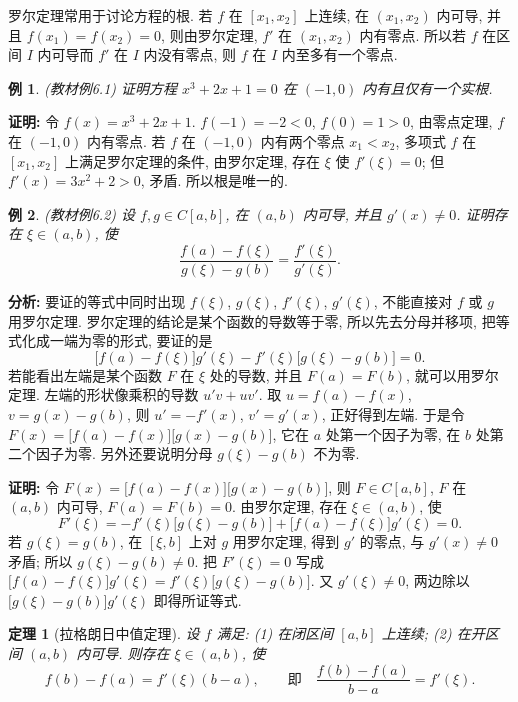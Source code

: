 \documentclass[UTF8,openany]{ctexbook}
\theoremstyle{chinesetextbook}
\newtheorem{example}{例}[section]
\newtheorem{theorem}{定理}[section]
\newenvironment{cnproof}{\par\indent\textbf{证明:} \ignorespaces}{\par}
\begin{document}
罗尔定理常用于讨论方程的根. 若 $f$ 在 $[x_1,x_2]$ 上连续, 在 $(x_1,x_2)$ 内可导, 并且 $f(x_1)=f(x_2)=0$, 则由罗尔定理, $f'$ 在 $(x_1,x_2)$ 内有零点. 所以若 $f$ 在区间 $I$ 内可导而 $f'$ 在 $I$ 内没有零点, 则 $f$ 在 $I$ 内至多有一个零点.
\begin{example}\label{ex:c2-6-1}
\textnormal{(教材例6.1)} 证明方程 $x^3+2x+1=0$ 在 $(-1,0)$ 内有且仅有一个实根.
\end{example}
\begin{cnproof}
令 $f(x)=x^3+2x+1$. $f(-1)=-2<0$, $f(0)=1>0$, 由零点定理, $f$ 在 $(-1,0)$ 内有零点. 若 $f$ 在 $(-1,0)$ 内有两个零点 $x_1<x_2$, 多项式 $f$ 在 $[x_1,x_2]$ 上满足罗尔定理的条件, 由罗尔定理, 存在 $\xi$ 使 $f'(\xi)=0$; 但 $f'(x)=3x^2+2>0$, 矛盾. 所以根是唯一的.
\end{cnproof}
\begin{example}\label{ex:c2-6-2}
\textnormal{(教材例6.2)} 设 $f,g\in C[a,b]$, 在 $(a,b)$ 内可导, 并且 $g'(x)\ne0$. 证明存在 $\xi\in(a,b)$, 使
\[
\frac{f(a)-f(\xi)}{g(\xi)-g(b)}=\frac{f'(\xi)}{g'(\xi)}.
\]
\end{example}
\par\indent\textbf{分析:} 要证的等式中同时出现 $f(\xi)$, $g(\xi)$, $f'(\xi)$, $g'(\xi)$, 不能直接对 $f$ 或 $g$ 用罗尔定理. 罗尔定理的结论是某个函数的导数等于零, 所以先去分母并移项, 把等式化成一端为零的形式, 要证的是
\[
\bigl[f(a)-f(\xi)\bigr]g'(\xi)-f'(\xi)\bigl[g(\xi)-g(b)\bigr]=0.
\]
若能看出左端是某个函数 $F$ 在 $\xi$ 处的导数, 并且 $F(a)=F(b)$, 就可以用罗尔定理. 左端的形状像乘积的导数 $u'v+uv'$. 取 $u=f(a)-f(x)$, $v=g(x)-g(b)$, 则 $u'=-f'(x)$, $v'=g'(x)$, 正好得到左端. 于是令 $F(x)=\bigl[f(a)-f(x)\bigr]\bigl[g(x)-g(b)\bigr]$, 它在 $a$ 处第一个因子为零, 在 $b$ 处第二个因子为零. 另外还要说明分母 $g(\xi)-g(b)$ 不为零.
\begin{cnproof}
令 $F(x)=\bigl[f(a)-f(x)\bigr]\bigl[g(x)-g(b)\bigr]$, 则 $F\in C[a,b]$, $F$ 在 $(a,b)$ 内可导, $F(a)=F(b)=0$. 由罗尔定理, 存在 $\xi\in(a,b)$, 使
\[
F'(\xi)=-f'(\xi)\bigl[g(\xi)-g(b)\bigr]+\bigl[f(a)-f(\xi)\bigr]g'(\xi)=0.
\]
若 $g(\xi)=g(b)$, 在 $[\xi,b]$ 上对 $g$ 用罗尔定理, 得到 $g'$ 的零点, 与 $g'(x)\ne0$ 矛盾; 所以 $g(\xi)-g(b)\ne0$. 把 $F'(\xi)=0$ 写成 $\bigl[f(a)-f(\xi)\bigr]g'(\xi)=f'(\xi)\bigl[g(\xi)-g(b)\bigr]$. 又 $g'(\xi)\ne0$, 两边除以 $\bigl[g(\xi)-g(b)\bigr]g'(\xi)$ 即得所证等式.
\end{cnproof}
\begin{theorem}[拉格朗日中值定理]\label{thm:c2-6-lagrange}
设 $f$ 满足: (1) 在闭区间 $[a,b]$ 上连续; (2) 在开区间 $(a,b)$ 内可导. 则存在 $\xi\in(a,b)$, 使
\[
f(b)-f(a)=f'(\xi)(b-a),\qquad\text{即}\quad\frac{f(b)-f(a)}{b-a}=f'(\xi).
\]
\end{theorem}
\end{document}
